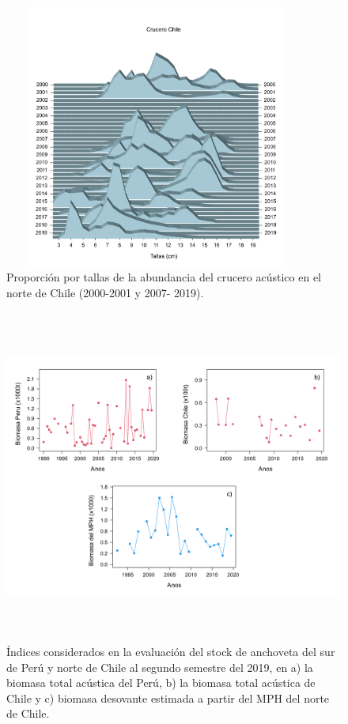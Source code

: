 \documentclass[letter,11pt]{article}
\begin{document}
\newpage


\vspace{0.5cm}
\begin{figure}[htb!]
 \centering
 \includegraphics[width=10cm,height=8.7cm]{fig/figura01.pdf}
 \caption{Proporci\'on por tallas de la abundancia del crucero ac\'ustico en el norte de Chile (2000-2001 y 2007- 2019).}
 \label{Fig01}
\end{figure}
\vspace{0.5cm}



\vspace{0.5cm}
\begin{figure}[htb!]
 \centering
 \includegraphics[width=12cm,height=11cm]{fig/figura02.pdf}
 \caption{\'Indices considerados en la evaluaci\'on del stock de anchoveta del sur de Per\'u y norte de Chile al segundo semestre del 2019, en a) la biomasa total ac\'ustica del Per\'u, b) la biomasa total ac\'ustica de Chile y c) biomasa desovante estimada a partir del MPH del norte de Chile.}
 \label{Fig02}
\end{figure}
\vspace{0.5cm}
\end{document}
